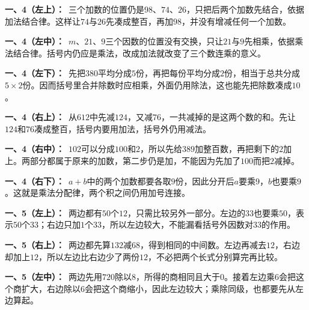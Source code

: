 \documentclass[multi=snippet,border=0pt]{standalone}
\newenvironment{snippet}[3]{\begin{minipage}{#1bp}\color{answerred}\fontsize{#2}{#3}\selectfont\raggedright}{\end{minipage}}
\begin{document}
\begin{snippet}{505}{11.5}{14}\textbf{一、4（左上）：}\ 三个加数的位置仍是\(98\)、\(74\)、\(26\)，只把后两个加数先结合，依据加法结合律。这样让\(74\)与\(26\)先凑成整百，再加\(98\)，并没有增减任何一个加数。\end{snippet}
\begin{snippet}{505}{11.5}{14}\textbf{一、4（左中）：}\ \(m\)、\(21\)、\(9\)三个因数的位置没有交换，只让\(21\)与\(9\)先相乘，依据乘法结合律。括号内仍应是乘法，改成加法就改变了三个数连乘的意义。\end{snippet}
\begin{snippet}{505}{11.5}{14}\textbf{一、4（左下）：}\ 先把\(380\)平均分成\(5\)份，再把每份平均分成\(2\)份，相当于总共分成\(5\times2\)份。因而括号里合并除数时应相乘，外面仍用除法，这也能先把除数凑成\(10\)。\end{snippet}
\begin{snippet}{505}{11.5}{14}\textbf{一、4（右上）：}\ 从\(612\)中先减\(124\)，又减\(76\)，一共减掉的是这两个数的和。先让\(124\)和\(76\)凑成整百，括号内要用加法，括号外仍用减法。\end{snippet}
\begin{snippet}{505}{11.5}{14}\textbf{一、4（右中）：}\ \(102\)可以分成\(100\)和\(2\)，所以先给\(389\)加整百数，再把剩下的\(2\)加上。两部分都属于原来的加数，第二步仍是加，不能因为先加了\(100\)而把\(2\)减掉。\end{snippet}
\begin{snippet}{505}{11.5}{14}\textbf{一、4（右下）：}\ \(a+b\)中的两个加数都要各取\(9\)份，因此分开后\(a\)要乘\(9\)，\(b\)也要乘\(9\)。这就是乘法分配律，两个积之间仍用加号连接。\end{snippet}
\begin{snippet}{505}{11.5}{14}\textbf{一、5（左上）：}\ 两边都有\(50\)个\(12\)，只需比较另外一部分。左边的\(33\)也要乘\(50\)，表示\(50\)个\(33\)；右边只加\(1\)个\(33\)，所以左边较大，不能漏看括号外因数对\(33\)的作用。\end{snippet}
\begin{snippet}{505}{11.5}{14}\textbf{一、5（右上）：}\ 两边都先算\(132\)减\(68\)，得到相同的中间数。左边再减去\(12\)，右边却加上\(12\)，所以左边比右边少了两份\(12\)，不必把两个长式分别算完再比较。\end{snippet}
\begin{snippet}{505}{11.5}{14}\textbf{一、5（左中）：}\ 两边先用\(720\)除以\(8\)，所得的商相同且大于\(0\)。接着左边乘\(6\)会把这个商扩大，右边除以\(6\)会把这个商缩小，因此左边较大；乘除同级，也都要先从左边算起。\end{snippet}
\end{document}
